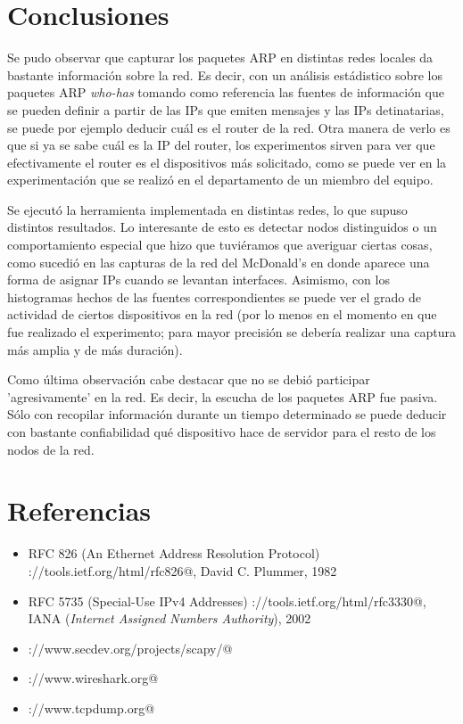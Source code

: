 \section{Conclusiones}

Se pudo observar que capturar los paquetes ARP en distintas redes locales da bastante informaci\'on
sobre la red. Es decir, con un an\'alisis est\'adistico sobre los paquetes ARP \emph{who-has} 
tomando como referencia las fuentes de informaci\'on que se pueden definir a partir de las IPs
que emiten mensajes y las IPs detinatarias, se puede por ejemplo deducir cu\'al es el router de
la red. Otra manera de verlo es que si ya se sabe cu\'al es la IP del router, los experimentos
sirven para ver que efectivamente el router es el dispositivos m\'as solicitado, como se puede
ver en la experimentaci\'on que se realiz\'o en el departamento de un miembro del equipo.

Se ejecut\'o la herramienta implementada en distintas redes, lo que supuso distintos resultados. 
Lo interesante de esto es detectar nodos distinguidos o un comportamiento especial que hizo que
tuvi\'eramos que averiguar ciertas cosas, como sucedi\'o en las capturas de la red del McDonald's
en donde aparece una forma de asignar IPs cuando se levantan interfaces. Asimismo, con los 
histogramas hechos de las fuentes correspondientes se puede ver el grado de actividad de ciertos
dispositivos en la red (por lo menos en el momento en que fue realizado el experimento; para mayor
precisi\'on se deber\'ia realizar una captura m\'as amplia y de m\'as duraci\'on).

Como \'ultima observaci\'on cabe destacar que no se debi\'o participar 'agresivamente' en la red. Es
decir, la escucha de los paquetes ARP fue pasiva. S\'olo con recopilar informaci\'on durante un 
tiempo determinado se puede deducir con bastante confiabilidad qu\'e dispositivo hace de servidor
para el resto de los nodos de la red. 

\newpage

\section{Referencias}

\begin{itemize}

\item RFC 826 (An Ethernet Address Resolution Protocol) \verb@http://tools.ietf.org/html/rfc826@, David
C. Plummer, 1982

\item RFC 5735 (Special-Use IPv4 Addresses) \verb@http://tools.ietf.org/html/rfc3330@, IANA 
(\emph{Internet Assigned Numbers Authority}), 2002

\item \verb@http://www.secdev.org/projects/scapy/@

\item \verb@http://www.wireshark.org@

\item \verb@http://www.tcpdump.org@

\end{itemize}




